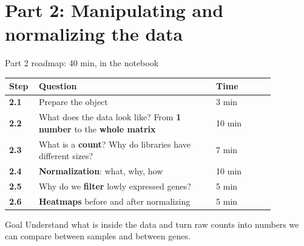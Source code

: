 \section{Part 2: Manipulating and normalizing the data}

\begin{frame}{Part 2 roadmap: 40 min, in the notebook}
  \small
  \begin{tabular}{@{}p{0.07\linewidth}p{0.6\linewidth}p{0.2\linewidth}@{}}
    \toprule
    \textbf{Step} & \textbf{Question} & \textbf{Time}\\\midrule
    \textbf{2.1} & Prepare the object & 3 min\\[3pt]
    \textbf{2.2} & What does the data look like? From \textbf{1 number} to the \textbf{whole matrix} & 10 min\\[3pt]
    \textbf{2.3} & What is a \textbf{count}? Why do libraries have different sizes? & 7 min\\[3pt]
    \textbf{2.4} & \textbf{Normalization}: what, why, how & 10 min\\[3pt]
    \textbf{2.5} & Why do we \textbf{filter} lowly expressed genes? & 5 min\\[3pt]
    \textbf{2.6} & \textbf{Heatmaps} before and after normalizing & 5 min\\
    \bottomrule
  \end{tabular}
  \vspace{0.3cm}

  \begin{block}{Goal}
    Understand what is inside the data and turn \alert{raw counts} into numbers we can \alert{compare} between samples and between genes.
  \end{block}
\end{frame}

